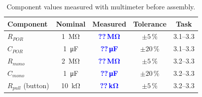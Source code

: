 \documentclass[12pt, a4paper]{article}
\newcommand{\val}[1]{\textcolor{blue}{\textbf{??\,\si{#1}}}}
\begin{document}
\begin{table}[H]
  \centering
  \caption{Component values measured with multimeter before assembly.}
  \label{tab:components}
  \begin{tabular}{lcccc}
    \toprule
    Component & Nominal & Measured & Tolerance & Task \\
    \midrule
    $R_{POR}$              & \SI{1}{\mega\ohm}    & \val{\mega\ohm}    & $\pm5\,\%$  & 3.1--3.3 \\
    $C_{POR}$              & \SI{1}{\micro\farad} & \val{\micro\farad} & $\pm20\,\%$ & 3.1--3.3 \\
    $R_{mono}$             & \SI{2}{\mega\ohm}    & \val{\mega\ohm}    & $\pm5\,\%$  & 3.2--3.3 \\
    $C_{mono}$             & \SI{1}{\micro\farad} & \val{\micro\farad} & $\pm20\,\%$ & 3.2--3.3 \\
    $R_{pull}$ (button)    & \SI{10}{\kilo\ohm}   & \val{\kilo\ohm}    & $\pm5\,\%$  & 3.2--3.3 \\
    \bottomrule
  \end{tabular}
\end{table}
\end{document}
